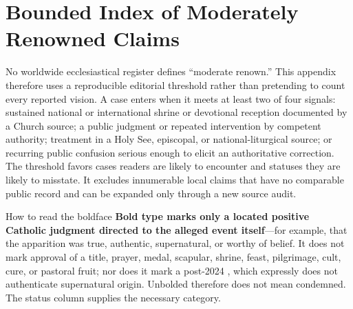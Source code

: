 \section{Bounded Index of Moderately Renowned Claims}

No worldwide ecclesiastical register defines ``moderate renown.'' This appendix therefore uses a reproducible editorial threshold rather than pretending to count every reported vision. A case enters when it meets at least two of four signals: sustained national or international shrine or devotional reception documented by a Church source; a public judgment or repeated intervention by competent authority; treatment in a Holy See, episcopal, or national-liturgical source; or recurring public confusion serious enough to elicit an authoritative correction. The threshold favors cases readers are likely to encounter and statuses they are likely to misstate. It excludes innumerable local claims that have no comparable public record and can be expanded only through a new source audit.

\begin{studybox}{How to read the boldface}
\textbf{Bold type marks only a located positive Catholic judgment directed to the alleged event itself}---for example, that the apparition was true, authentic, supernatural, or worthy of belief. It does not mark approval of a title, prayer, medal, scapular, shrine, feast, pilgrimage, cult, cure, or pastoral fruit; nor does it mark a post-2024 , which expressly does not authenticate supernatural origin. Unbolded therefore does not mean condemned. The status column supplies the necessary category.
\end{studybox}

